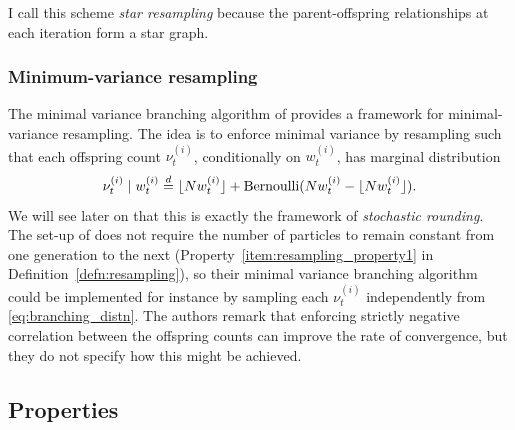 I call this scheme \emph{star resampling} because the parent-offspring relationships at each iteration form a star graph.


\subsubsection{Minimum-variance resampling}

The minimal variance branching algorithm of \textcite{crisan1999} provides a framework for minimal-variance resampling. The idea is to enforce minimal variance by resampling such that each offspring count $\nu_t^{(i)}$, conditionally on $w_t^{(i)}$, has marginal distribution
\begin{equation}\label{eq:branching_distn}
\nu_t^{(i)} \mid w_t^{(i)} \overset{d}{=} \lfloor N w_t^{(i)} \rfloor + \operatorname{Bernoulli}(Nw_t^{(i)} - \lfloor N w_t^{(i)} \rfloor) .
\end{equation}
We will see later on that this is exactly the framework of \emph{stochastic rounding}.
The set-up of \textcite{crisan1999} does not require the number of particles to remain constant from one generation to the next (Property~\ref{item:resampling_property1} in Definition~\ref{defn:resampling}), so their minimal variance branching algorithm could be implemented for instance by sampling each $\nu_t^{(i)}$ independently from \eqref{eq:branching_distn}. The authors remark that enforcing strictly negative correlation between the offspring counts can improve the rate of convergence, but they do not specify how this might be achieved.





\subsection{Properties \seb{$\sim$} }\label{sec:resampling_properties}



